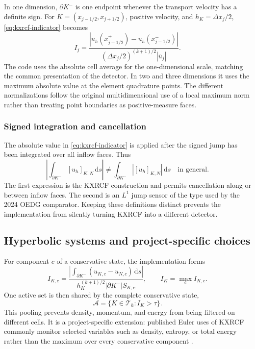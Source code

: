 In one dimension, $\partial K^-$ is one endpoint whenever the transport
velocity has a definite sign.  For $K=(x_{j-1/2},x_{j+1/2})$, positive
velocity, and $h_K=\Delta x_j/2$, \cref{eq:kxrcf-indicator} becomes
\begin{equation}
 I_j=
 \frac{\left|u_h(x_{j-1/2}^{+})-
                   u_h(x_{j-1/2}^{-})\right|}
      {(\Delta x_j/2)^{(k+1)/2}|\overline u_j|}.
 \label{eq:kxrcf-1d}
\end{equation}
The code uses the absolute cell average for the one-dimensional scale, matching
the common presentation of the detector.  In two and three dimensions it uses
the maximum absolute value at the element quadrature points.  The different
normalizations follow the original multidimensional use of a local maximum
norm rather than treating point boundaries as positive-measure faces.

\subsubsection{Signed integration and cancellation}

The absolute value in \cref{eq:kxrcf-indicator} is applied after the signed
jump has been integrated over all inflow faces.  Thus
\begin{equation}
 \left|\int_{\partial K^-}[u_h]_{K,N}\,\mathrm ds\right|
 \neq
 \int_{\partial K^-}|[u_h]_{K,N}|\,\mathrm ds
 \quad\text{in general}.
\end{equation}
The first expression is the KXRCF construction and permits cancellation along
or between inflow faces.  The second is an $L^1$ jump sensor of the type used by
the 2024 OEDG comparator.  Keeping these definitions distinct prevents the
implementation from silently turning KXRCF into a different detector.

\subsection{Hyperbolic systems and project-specific choices}

For component $c$ of a conservative state, the implementation forms
\begin{equation}
 I_{K,c}=
 \frac{\left|\displaystyle\int_{\partial K^-}
       (u_{K,c}-u_{N,c})\,\mathrm ds\right|}
      {h_K^{(k+1)/2}|\partial K^-|S_{K,c}},
 \qquad
 I_K=\max_c I_{K,c}.
 \label{eq:kxrcf-components}
\end{equation}
One active set is then shared by the complete conservative state,
\begin{equation}
  \mathcal A=\{K\in\mathcal T_h:I_K>\tau\}.
  \label{eq:kxrcf-active-set}
\end{equation}
This pooling prevents density, momentum, and energy from being filtered on
different cells.  It is a project-specific extension: published Euler uses of
KXRCF commonly monitor selected variables such as density, entropy, or total
energy rather than the maximum over every conservative component
\cite{KrivodonovaEtAl2004,FuShu2017}.

